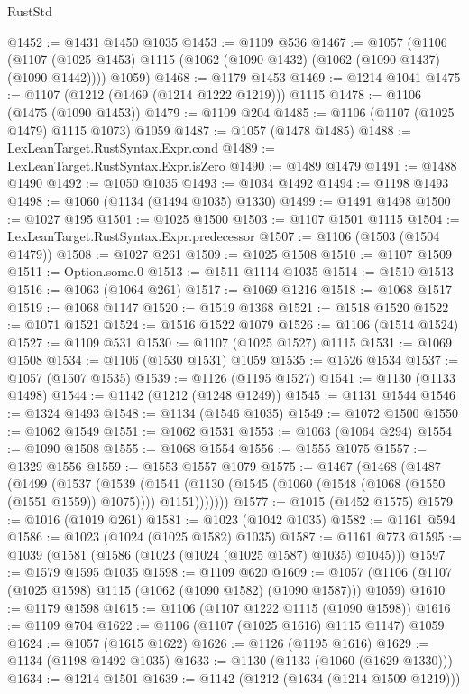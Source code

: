 \begin{lexlean}{RustStd}
\begin{coremodule}
{\begin{coremodule}
{{{{{{{{{{{{{{{{{{{{{{{{{{{{{{{{{{{@1452 := @1431 @1450 @1035
@1453 := @1109 @536
@1467 := @1057
    (@1106
      (@1107 (@1025 @1453) @1115 (@1062 (@1090 @1432) (@1062 (@1090 @1437) (@1090 @1442))))
      @1059)
@1468 := @1179 @1453
@1469 := @1214 @1041
@1475 := @1107 (@1212 (@1469 (@1214 @1222 @1219))) @1115
@1478 := @1106 (@1475 (@1090 @1453))
@1479 := @1109 @204
@1485 := @1106 (@1107 (@1025 @1479) @1115 @1073) @1059
@1487 := @1057 (@1478 @1485)
@1488 := LexLeanTarget.RustSyntax.Expr.cond
@1489 := LexLeanTarget.RustSyntax.Expr.isZero
@1490 := @1489 @1479
@1491 := @1488 @1490
@1492 := @1050 @1035
@1493 := @1034 @1492
@1494 := @1198 @1493
@1498 := @1060 (@1134 (@1494 @1035) @1330)
@1499 := @1491 @1498
@1500 := @1027 @195
@1501 := @1025 @1500
@1503 := @1107 @1501 @1115
@1504 := LexLeanTarget.RustSyntax.Expr.predecessor
@1507 := @1106 (@1503 (@1504 @1479))
@1508 := @1027 @261
@1509 := @1025 @1508
@1510 := @1107 @1509
@1511 := Option.some.{0}
@1513 := @1511 @1114 @1035
@1514 := @1510 @1513
@1516 := @1063 (@1064 @261)
@1517 := @1069 @1216
@1518 := @1068 @1517
@1519 := @1068 @1147
@1520 := @1519 @1368
@1521 := @1518 @1520
@1522 := @1071 @1521
@1524 := @1516 @1522 @1079
@1526 := @1106 (@1514 @1524)
@1527 := @1109 @531
@1530 := @1107 (@1025 @1527) @1115
@1531 := @1069 @1508
@1534 := @1106 (@1530 @1531) @1059
@1535 := @1526 @1534
@1537 := @1057 (@1507 @1535)
@1539 := @1126 (@1195 @1527)
@1541 := @1130 (@1133 @1498)
@1544 := @1142 (@1212 (@1248 @1249))
@1545 := @1131 @1544
@1546 := @1324 @1493
@1548 := @1134 (@1546 @1035)
@1549 := @1072 @1500
@1550 := @1062 @1549
@1551 := @1062 @1531
@1553 := @1063 (@1064 @294)
@1554 := @1090 @1508
@1555 := @1068 @1554
@1556 := @1555 @1075
@1557 := @1329 @1556
@1559 := @1553 @1557 @1079
@1575 := @1467
    (@1468
      (@1487
        (@1499
          (@1537
            (@1539
              (@1541 (@1130 (@1545 (@1060 (@1548 (@1068 (@1550 (@1551 @1559)) @1075)))) @1151)))))))
@1577 := @1015 (@1452 @1575)
@1579 := @1016 (@1019 @261)
@1581 := @1023 (@1042 @1035)
@1582 := @1161 @594
@1586 := @1023 (@1024 (@1025 @1582) @1035)
@1587 := @1161 @773
@1595 := @1039 (@1581 (@1586 (@1023 (@1024 (@1025 @1587) @1035) @1045)))
@1597 := @1579 @1595 @1035
@1598 := @1109 @620
@1609 := @1057 (@1106 (@1107 (@1025 @1598) @1115 (@1062 (@1090 @1582) (@1090 @1587))) @1059)
@1610 := @1179 @1598
@1615 := @1106 (@1107 @1222 @1115 (@1090 @1598))
@1616 := @1109 @704
@1622 := @1106 (@1107 (@1025 @1616) @1115 @1147) @1059
@1624 := @1057 (@1615 @1622)
@1626 := @1126 (@1195 @1616)
@1629 := @1134 (@1198 @1492 @1035)
@1633 := @1130 (@1133 (@1060 (@1629 @1330)))
@1634 := @1214 @1501
@1639 := @1142 (@1212 (@1634 (@1214 @1509 @1219)))
}}}}}}}}}}}}}}}}}}}}}}}}}}}}}}}}}}}
\end{coremodule}}
\end{coremodule}
\end{lexlean}
